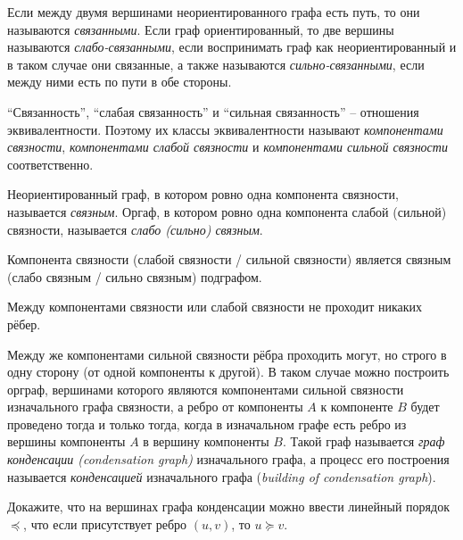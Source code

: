 \documentclass[12pt,a4paper]{article}
\begin{document}
    \begin{definition}
        Если между двумя вершинами неориентированного графа есть путь, то они называются \emph{связанными}. Если граф ориентированный, то две вершины называются \emph{слабо-связанными}, если воспринимать граф как неориентированный и в таком случае они связанные, а также называются \emph{сильно-связанными}, если между ними есть по пути в обе стороны.

        ``Связанность'', ``слабая связанность'' и ``сильная связанность'' -- отношения эквивалентности. Поэтому их классы эквивалентности называют \emph{компонентами связности}, \emph{компонентами слабой связности} и \emph{компонентами сильной связности} соответственно.

        Неориентированный граф, в котором ровно одна компонента связности, называется \emph{связным}. Оргаф, в котором ровно одна компонента слабой (сильной) связности, называется \emph{слабо (сильно) связным}.
    \end{definition}

    \begin{statement}
        Компонента связности (слабой связности / сильной связности) является связным (слабо связным / сильно связным) подграфом.
    \end{statement}

    \begin{remark}
        Между компонентами связности или слабой связности не проходит никаких рёбер.
        
        Между же компонентами сильной связности рёбра проходить могут, но строго в одну сторону (от одной компоненты к другой). В таком случае можно построить орграф, вершинами которого являются компонентами сильной связности изначального графа связности, а ребро от компоненты $A$ к компоненте $B$ будет проведено тогда и только тогда, когда в изначальном графе есть ребро из вершины компоненты $A$ в вершину компоненты $B$. Такой граф называется \emph{граф конденсации (condensation graph)} изначального графа, а процесс его построения называется \emph{конденсацией} изначального графа (\emph{building of condensation graph}).
    \end{remark}

    \begin{exercise*}
        Докажите, что на вершинах графа конденсации можно ввести линейный порядок $\preccurlyeq$, что если присутствует ребро $(u, v)$, то $u \succcurlyeq v$.
    \end{exercise*}
\end{document}
